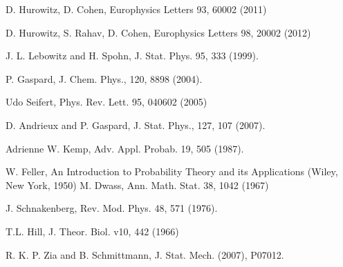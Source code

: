 \documentclass[aps,pre,floats,floatfix,twocolumn]{revtex4}
\newcommand{\Fig}[1]{\textcolor{blue}{Fig.}\!\!~\ref{#1}}
\begin{document}
\begin{thebibliography}{99}

D. Hurowitz, D. Cohen,
Europhysics Letters 93, 60002 (2011) 


D. Hurowitz, S. Rahav, D. Cohen,
Europhysics Letters 98, 20002 (2012) 



 J. L. Lebowitz and H. Spohn, 
 J. Stat. Phys. 95, 333 (1999).
 
P. Gaspard, 
J. Chem. Phys., 120, 8898 (2004).

Udo Seifert, 
Phys. Rev. Lett. 95, 040602 (2005)

D. Andrieux and P. Gaspard, 
J. Stat. Phys., 127, 107 (2007).



Adrienne W. Kemp,
Adv. Appl. Probab. 19, 505 (1987).

W. Feller, 
An Introduction to Probability Theory and its
Applications (Wiley, New York, 1950)
M. Dwass, 
Ann. Math. Stat. 38, 1042 (1967)


J. Schnakenberg,
Rev. Mod. Phys. 48, 571 (1976).

T.L. Hill, 
J. Theor. Biol. v10, 442 (1966)

R. K. P. Zia and B. Schmittmann, 
J. Stat. Mech. (2007), P07012.






\end{thebibliography}
\end{document}
